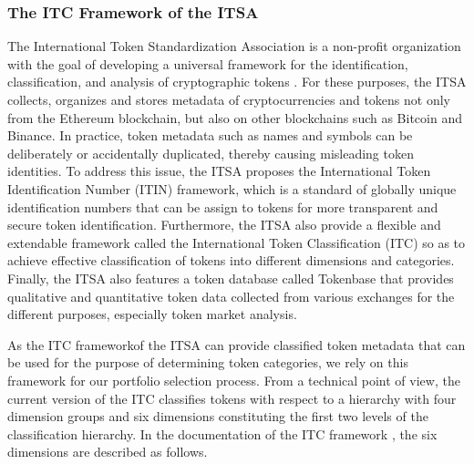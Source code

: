 \subsubsection{The ITC Framework of the ITSA}


The International Token Standardization Association is a non-profit organization with the goal of developing a universal framework for the identification, classification, and analysis of cryptographic tokens \cite{itsadefinition}. For these purposes, the ITSA collects, organizes and stores metadata of cryptocurrencies and tokens not only from the Ethereum blockchain, but also on other blockchains such as Bitcoin and Binance. In practice, token metadata such as names and symbols can be deliberately or accidentally duplicated, thereby causing misleading token identities. To address this issue, the ITSA proposes the International Token Identification Number (ITIN) framework, which is a standard of globally unique identification numbers that can be assign to tokens for more transparent and secure token identification. Furthermore, the ITSA also provide a flexible and extendable framework called the International Token Classification (ITC) so as to achieve effective classification of tokens into different dimensions and categories. Finally, the ITSA also features a token database called Tokenbase that provides qualitative and quantitative token data collected from various exchanges for the different purposes, especially token market analysis.


As the ITC frameworkof the ITSA can provide classified token metadata that can be used for the purpose of determining token categories, we rely on this framework for our portfolio selection process. From a technical point of view, the current version of the ITC classifies tokens with respect to a hierarchy with four dimension groups and six dimensions constituting the first two levels of the classification hierarchy. In the documentation of the ITC framework \cite{itcDocs}, the six dimensions are described as follows.

